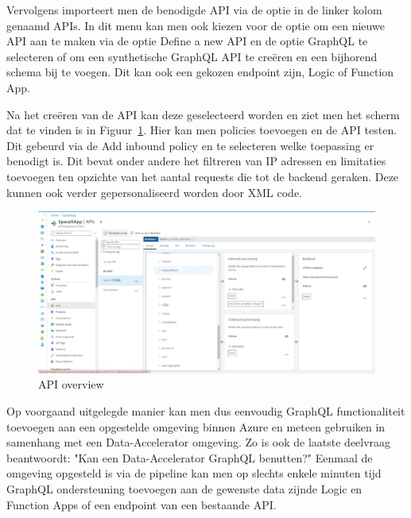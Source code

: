 Vervolgens importeert men de benodigde API via de optie in de linker kolom genaamd APIs. In dit menu kan men ook kiezen voor de optie om een nieuwe API aan te maken via de optie Define a new API en de optie GraphQL te selecteren of om een synthetische GraphQL API te creëren en een bijhorend schema bij te voegen. Dit kan ook een gekozen endpoint zijn, Logic of Function App.

Na het creëren van de API kan deze geselecteerd worden en ziet men het scherm dat te vinden is in Figuur~\ref{fig:API}. Hier kan men policies toevoegen en de API testen. Dit gebeurd via de Add inbound policy en te selecteren welke toepassing er benodigt is. Dit bevat onder andere het filtreren van IP adressen en limitaties toevoegen ten opzichte van het aantal requests die tot de backend geraken. Deze kunnen ook verder gepersonaliseerd worden door XML code.

\begin{figure}
    \centering
    \includegraphics[scale=0.60]{../img/API.png}
    \caption{\label{fig:API}API overview}
\end{figure}

Op voorgaand uitgelegde manier kan men dus eenvoudig GraphQL functionaliteit toevoegen aan een opgestelde omgeving binnen Azure en meteen gebruiken in samenhang met een Data-Accelerator omgeving. Zo is ook de laatste deelvraag beantwoordt: "Kan een Data-Accelerator GraphQL benutten?" Eenmaal de omgeving opgesteld is via de pipeline kan men op slechts enkele minuten tijd GraphQL ondersteuning toevoegen aan de gewenste data zijnde Logic en Function Apps of een endpoint van een bestaande API.




